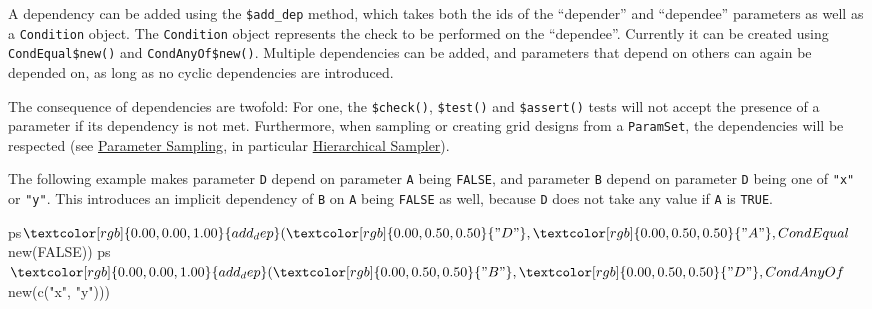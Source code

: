 \documentclass[
  11pt,
  parskip=half,
  DIV=calc,
  BCOR=10mm,
  x11names]{scrbook}
\newenvironment{Shaded}{}{}
\newcommand{\KeywordTok}[1]{\textcolor[rgb]{0.00,0.00,1.00}{#1}}
\newcommand{\NormalTok}[1]{#1}
\newcommand{\OperatorTok}[1]{#1}
\newcommand{\OtherTok}[1]{\textcolor[rgb]{1.00,0.25,0.00}{#1}}
\newcommand{\StringTok}[1]{\textcolor[rgb]{0.00,0.50,0.50}{#1}}
\begin{document}
A dependency can be added using the \texttt{\$add\_dep} method, which takes both the ids of the ``depender'' and ``dependee'' parameters as well as a \texttt{Condition} object.
The \texttt{Condition} object represents the check to be performed on the ``dependee''.
Currently it can be created using \texttt{CondEqual\$new()} and \texttt{CondAnyOf\$new()}.
Multiple dependencies can be added, and parameters that depend on others can again be depended on, as long as no cyclic dependencies are introduced.

The consequence of dependencies are twofold:
For one, the \texttt{\$check()}, \texttt{\$test()} and \texttt{\$assert()} tests will not accept the presence of a parameter if its dependency is not met.
Furthermore, when sampling or creating grid designs from a \texttt{ParamSet}, the dependencies will be respected (see \protect\hyperlink{parameter-sampling}{Parameter Sampling}, in particular \protect\hyperlink{hierarchical-sampler}{Hierarchical Sampler}).

The following example makes parameter \texttt{D} depend on parameter \texttt{A} being \texttt{FALSE}, and parameter \texttt{B} depend on parameter \texttt{D} being one of \texttt{"x"} or \texttt{"y"}.
This introduces an implicit dependency of \texttt{B} on \texttt{A} being \texttt{FALSE} as well, because \texttt{D} does not take any value if \texttt{A} is \texttt{TRUE}.

\begin{Shaded}
\begin{Highlighting}[]
\NormalTok{ps}\OperatorTok{$}\KeywordTok{add_dep}\NormalTok{(}\StringTok{"D"}\NormalTok{, }\StringTok{"A"}\NormalTok{, CondEqual}\OperatorTok{$}\KeywordTok{new}\NormalTok{(}\OtherTok{FALSE}\NormalTok{))}
\NormalTok{ps}\OperatorTok{$}\KeywordTok{add_dep}\NormalTok{(}\StringTok{"B"}\NormalTok{, }\StringTok{"D"}\NormalTok{, CondAnyOf}\OperatorTok{$}\KeywordTok{new}\NormalTok{(}\KeywordTok{c}\NormalTok{(}\StringTok{"x"}\NormalTok{, }\StringTok{"y"}\NormalTok{)))}
\end{Highlighting}
\end{Shaded}
\end{document}
